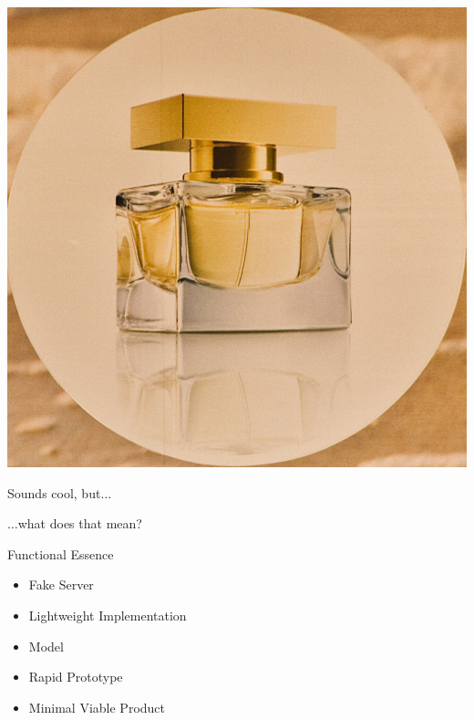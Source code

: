 \begin{frame}[fragile]{}
\vspace{-.65em}
\begin{center}
\includegraphics[height=\paperheight]{images/essence_large}
\end{center}

\end{frame}

\begin{frame}[fragile]{}

\begin{center}
{\Huge
Sounds cool, but$\ldots$

\vspace{1.5em}
$\ldots$what does that mean?
}
\end{center}

\end{frame}

\begin{frame}[fragile]{Functional Essence}

\begin{itemize}[<+->]
\item Fake Server
\item Lightweight Implementation

\vspace{1em}

\item Model

\vspace{1em}

\item Rapid Prototype
\item Minimal Viable Product
\end{itemize}

\end{frame}


